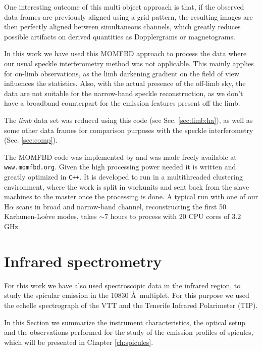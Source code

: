 One interesting outcome of this multi object approach is that, if the observed data frames are previously aligned using a grid pattern, the resulting images are then perfectly aligned between simultaneous channels, which greatly reduces possible artifacts on derived quantities as Dopplergrams or magnetograms.

In this work we have used this MOMFBD approach to process the data where our usual speckle interferometry method was not applicable. This mainly applies for on-limb observations, as the limb darkening gradient on the field of view influences the statistics. Also, with the actual presence of the off-limb sky, the data are not suitable for the narrow-band speckle reconstruction, as we don't have a broadband counterpart for the emission features present off the limb.

The \emph{limb} data set was reduced using this code (see Sec. \ref{sec:limb:ha}), as well as some other data frames for comparison purposes with the speckle interferometry  (Sec. \ref{sec:comp}).

The MOMFBD code was implemented by \cite{2005SoPh..228..191V} and was made freely available at \verb"www.momfbd.org". Given the high processing power needed it is written and greatly optimized in \verb"C++". It is developed to run in a multithreaded clustering environment, where the work is split in workunits and sent back from the slave machines to the master once the processing is done. A typical run with one of our H$\alpha$ scans in broad and narrow-band channel, reconstructing the first 50 Karhunen-Lo\`eve modes, takes $\sim7$ hours to process with 20 CPU cores of $3.2$ GHz.



\section{Infrared spectrometry}

For this work we have also used spectroscopic data in the infrared region, to study the spicular emission in the  10830 \AA\, multiplet. 
For this purpose we used the echelle spectrograph of the VTT and the Tenerife Infrared Polarimeter (TIP).

In this Section we summarize the instrument characteristics, the optical setup
 and the observations performed for the study of the emission profiles of spicules, which will be presented in Chapter \ref{ch:spicules}.


